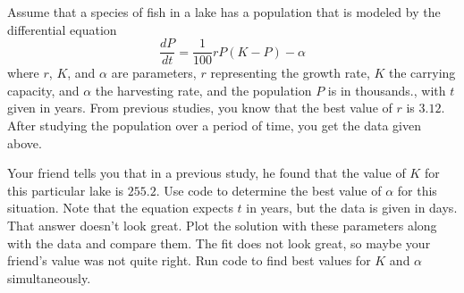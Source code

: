 \begin{exercise}\label{ex:ModelingParamPop}
Assume that a species of fish in a lake has a population that is modeled by the differential equation
\begin{equation*}
\frac{dP}{dt} = \frac{1}{100}rP(K - P) - \alpha 
\end{equation*}
where $r$, $K$, and $\alpha$ are parameters, $r$ representing the growth rate, $K$ the carrying capacity, and $\alpha$ the harvesting rate, and the population $P$ is in thousands., with $t$ given in years. From previous studies, you know that the best value of $r$ is $3.12$. After studying the population over a period of time, you get the data given above.
\begin{tasks}
\task Your friend tells you that in a previous study, he found that the value of $K$ for this particular lake is $255.2$. Use code to determine the best value of $\alpha$ for this situation. Note that the equation expects $t$ in years, but the data is given in days. 
\task That answer doesn't look great. Plot the solution with these parameters along with the data and compare them.
\task The fit does not look great, so maybe your friend's value was not quite right. Run code to find best values for $K$ and $\alpha$ simultaneously. 
\end{tasks}

\end{exercise}
%

